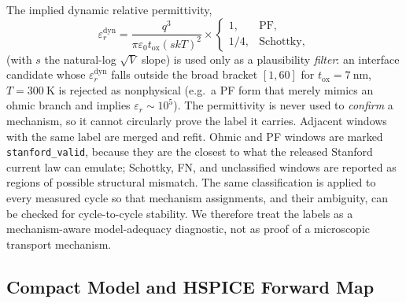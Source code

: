 \documentclass[journal]{IEEEtran}
\begin{document}
The implied dynamic relative permittivity,
\begin{equation}
  \varepsilon_r^{\mathrm{dyn}}
  =
  \frac{q^3}{\pi\varepsilon_0 t_{\mathrm{ox}}(s kT)^2}
  \times
  \begin{cases}
    1, & \mathrm{PF},\\
    1/4, & \mathrm{Schottky},
  \end{cases}
  \label{eq:eps-dyn}
\end{equation}
(with $s$ the natural-log $\sqrt{V}$ slope) is used only as a plausibility
\emph{filter}: an interface candidate whose $\varepsilon_r^{\mathrm{dyn}}$
falls outside the broad bracket $[1,60]$ for $t_{\mathrm{ox}}=\SI{7}{\nano\meter}$,
$T=\SI{300}{\kelvin}$ is rejected as nonphysical (e.g.\ a PF form that merely
mimics an ohmic branch and implies $\varepsilon_r\sim10^5$).  The permittivity
is never used to \emph{confirm} a mechanism, so it cannot circularly prove the
label it carries.  Adjacent windows with the same label are merged and refit.
Ohmic and PF windows are marked \texttt{stanford\_valid}, because they are the
closest to what the released Stanford current law can emulate; Schottky, FN,
and unclassified windows are reported as regions of possible structural
mismatch.  The same classification is applied to every measured cycle so that
mechanism assignments, and their ambiguity, can be checked for cycle-to-cycle
stability.  We therefore treat the labels as a mechanism-aware
model-adequacy diagnostic, not as proof of a microscopic transport mechanism.

\subsection{Compact Model and HSPICE Forward Map}
\label{sec:model}
\end{document}
